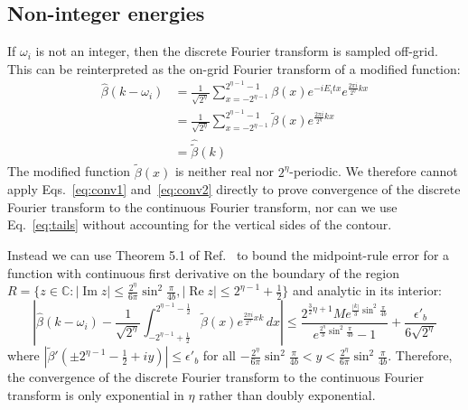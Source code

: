\documentclass[aps,floatfix,10pt,amssymb,amsfont,amsmath,superscriptaddress,float,nofootinbib,longbibliography,nobalancelastpage,twocolumn]{revtex4-2}
\begin{document}
\subsection{Non-integer energies}
If $\omega_{i}$ is not an integer, then the discrete Fourier transform is sampled off-grid. This can be reinterpreted as the on-grid Fourier transform of a modified function:
\begin{align}
    \hat \beta(k -\omega_{i}) &= \frac{1}{\sqrt{2^{\eta}}} \sum_{x=-2^{\eta-1}}^{2^{\eta-1}-1} \beta(x) e^{-iE_it x}e^{\frac{2\pi i}{2^{\eta}} kx}\\
    &= \frac{1}{\sqrt{2^{\eta}}} \sum_{x=-2^{\eta-1}}^{2^{\eta-1}-1} \tilde\beta(x)e^{\frac{2\pi i}{2^{\eta}} kx}\\
    &= \hat{\tilde\beta}(k)
\end{align}
The modified function $\tilde\beta(x)$ is neither real nor $2^{\eta}$-periodic. We therefore cannot apply Eqs.~\eqref{eq:conv1} and~\eqref{eq:conv2} directly to prove convergence of the discrete Fourier transform to the continuous Fourier transform, nor can we use Eq.~\eqref{eq:tails} without accounting for the vertical sides of the contour.

Instead we can use Theorem 5.1 of Ref.~\cite{javed2014trapezoidal} to bound the midpoint-rule error for a function with continuous first derivative on the boundary of the region $R = \{z \in \mathbb{C}: |\operatorname{Im} z| \leq  \frac{2^{\eta}}{6\pi}\sin^2\frac{\pi}{4b}, |\operatorname{Re} z| \leq 2^{\eta-1}+\frac{1}{2}\}$ and analytic in its interior:
\begin{equation}
    \left| \hat \beta\!\left(k-\omega_{i}\right) - \frac{1}{\sqrt{2^{\eta}}} \int_{-2^{\eta-1}+\frac{1}{2}}^{2^{\eta-1}-\frac{1}{2}}\tilde\beta(x)e^{\frac{2\pi i}{2^{\eta}}xk}\,dx \right| \leq \frac{2^{\frac{3}{2}\eta+1} Me^{\frac{|k|}{3}\sin^2 \frac{\pi}{4b}}}{e^{\frac{2^{\eta}}{3}\sin^2 \frac{\pi}{4b}}-1} + \frac{\epsilon'_{b}}{6\sqrt{2^{\eta}}}
\end{equation}
where $|\tilde\beta'(\pm2^{\eta-1}-\frac{1}{2}+iy)| \leq \epsilon'_{b}$ for all $-\frac{2^{\eta}}{6\pi}\sin^2\frac{\pi}{4b}<y<\frac{2^{\eta}}{6\pi}\sin^2\frac{\pi}{4b}$. Therefore, the convergence of the discrete Fourier transform to the continuous Fourier transform is only exponential in $\eta$ rather than doubly exponential.
\end{document}
